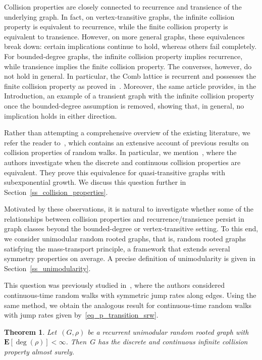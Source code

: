 \documentclass[a4paper,11pt]{article}
\newtheorem{theorem}{Theorem}
\theoremstyle{definition}
\begin{document}
Collision properties are closely connected to recurrence and transience of the underlying graph. In fact, on vertex-transitive graphs, the infinite collision property is equivalent to recurrence, while the finite collision property is equivalent to transience. However, on more general graphs, these equivalences break down: certain implications continue to hold, whereas others fail completely. For bounded-degree graphs, the infinite collision property implies recurrence, while transience implies the finite collision property. The converses, however, do not hold in general. In particular, the Comb lattice is recurrent and possesses the finite collision property as proved in~\cite{PeresKrishnapur04}. Moreover, the same article provides, in the Introduction, an example of a transient graph with the infinite collision property once the bounded-degree assumption is removed, showing that, in general, no implication holds in either direction. 

Rather than attempting a comprehensive overview of the existing literature, we refer the reader to~\cite[Related work]{Umb25}, which contains an extensive account of previous results on collision properties of random walks. In particular, we mention~\cite{Chen08}, where the authors investigate when the discrete and continuous collision properties are equivalent. They prove this equivalence for quasi-transitive graphs with subexponential growth. We discuss this question further in Section~\ref{ss_collision_properties}.

Motivated by these observations, it is natural to investigate whether some of the relationships between collision properties and recurrence/transience persist in graph classes beyond the bounded-degree or vertex-transitive setting. To this end, we consider unimodular random rooted graphs, that is, random rooted graphs satisfying the mass-transport principle, a framework that extends several symmetry properties on average. A precise definition of unimodularity is given in Section~\ref{ss_unimodularity}.

This question was previously studied in~\cite{HutchcroftPeres2015}, where the authors considered continuous-time random walks with symmetric jump rates along edges. Using the same method, we obtain the analogous result for continuous-time random walks with jump rates given by~\eqref{eq_p_transition_srw}.

\begin{theorem}{\cite{HutchcroftPeres2015}}\label{thm_unimodularity_ICP}
Let~$(G,\rho)$ be a recurrent unimodular random rooted graph with~$\mathbf E[ \deg(\rho) ] <  \infty$. Then~$G$ has the discrete and continuous infinite collision property almost surely. 
\end{theorem}
\end{document}
